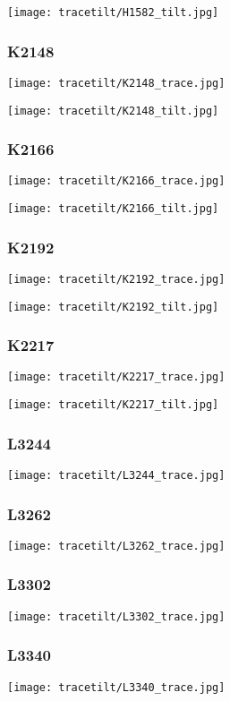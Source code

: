 \texttt{[image: tracetilt/H1582\_tilt.jpg]}

\subsubsection*{K2148}
\texttt{[image: tracetilt/K2148\_trace.jpg]}

\texttt{[image: tracetilt/K2148\_tilt.jpg]}

\subsubsection*{K2166}
\texttt{[image: tracetilt/K2166\_trace.jpg]}

\texttt{[image: tracetilt/K2166\_tilt.jpg]}

\subsubsection*{K2192}
\texttt{[image: tracetilt/K2192\_trace.jpg]}

\texttt{[image: tracetilt/K2192\_tilt.jpg]}

\subsubsection*{K2217}
\texttt{[image: tracetilt/K2217\_trace.jpg]}

\texttt{[image: tracetilt/K2217\_tilt.jpg]}

\subsubsection*{L3244}
\texttt{[image: tracetilt/L3244\_trace.jpg]}
\subsubsection*{L3262}
\texttt{[image: tracetilt/L3262\_trace.jpg]}
\subsubsection*{L3302}
\texttt{[image: tracetilt/L3302\_trace.jpg]}
\subsubsection*{L3340}
\texttt{[image: tracetilt/L3340\_trace.jpg]}
